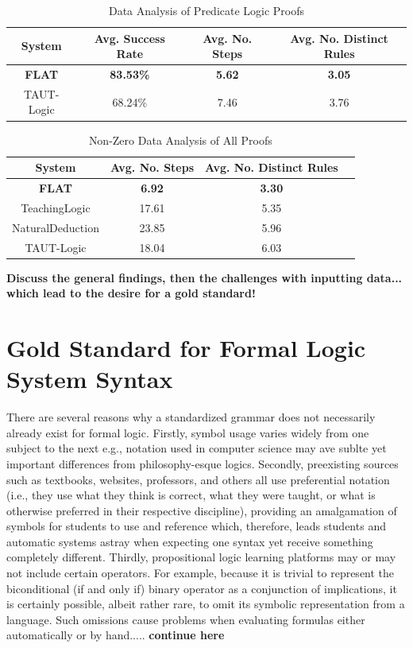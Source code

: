 \documentclass[ms]{uncgdissertationexp2}
\theoremstyle{plain}
\theoremstyle{definition}
\theoremstyle{remark}
\begin{document}
\begin{table}[h!]
	\centering
	\caption{Data Analysis of Predicate Logic Proofs}
	\begin{tabular}{*4c}
		\toprule
		System        & Avg. Success Rate & Avg. No. Steps & Avg. No. Distinct Rules \\    
		\midrule
		\textbf{FLAT} & \textbf{83.53\%}  & \textbf{5.62}  & \textbf{3.05}           \\
		TAUT-Logic    & 68.24\%           & 7.46           & 3.76                    \\
		\bottomrule
	\end{tabular}
	\label{table:predData}
\end{table}

\begin{table}[h!]
	\centering
	\caption{Non-Zero Data Analysis of All Proofs}
	\begin{tabular}{*4c}
		\toprule
		System           & Avg. No. Steps & Avg. No. Distinct Rules \\    
		\midrule
		\textbf{FLAT}    & \textbf{6.92}  & \textbf{3.30}           \\
		TeachingLogic    & 17.61          & 5.35                    \\
		NaturalDeduction & 23.85          & 5.96                    \\
		TAUT-Logic       & 18.04          & 6.03                    \\
		\bottomrule
	\end{tabular}
	\label{table:nzAllData}
\end{table}

\textbf{Discuss the general findings, then the challenges with inputting data... which lead to the desire for a gold standard!}    

\section{Gold Standard for Formal Logic System Syntax}
There are several reasons why a standardized grammar does not necessarily already exist for formal logic. Firstly, symbol usage varies widely from one subject to the next e.g., notation used in computer science may ave sublte yet important differences from philosophy-esque logics. Secondly, preexisting sources such as textbooks, websites, professors, and others all use preferential notation (i.e., they use what they think is correct, what they were taught, or what is otherwise preferred in their respective discipline), providing an amalgamation of symbols for students to use and reference which, therefore, leads students and automatic systems astray when expecting one syntax yet receive something completely different. Thirdly, propositional logic learning platforms may or may not include certain operators. For example, because it is trivial to represent the biconditional (if and only if) binary operator as a conjunction of implications, it is certainly possible, albeit rather rare, to omit its symbolic representation from a language. Such omissions cause problems when evaluating formulas either automatically or by hand..... \textbf{continue here}
\end{document}
